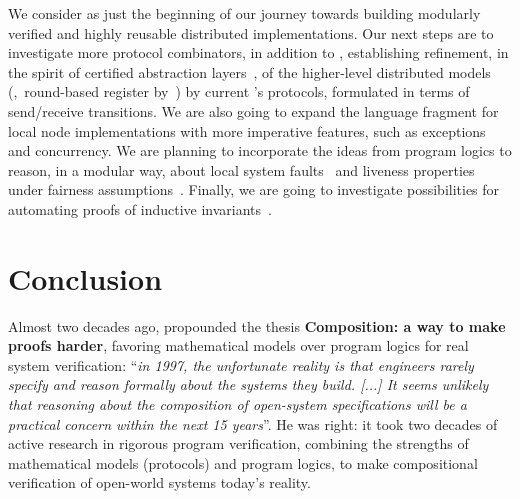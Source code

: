 We consider \disel as just the beginning of our journey towards
building modularly verified and highly reusable distributed
implementations.
%
Our next steps are to investigate more protocol combinators, in
addition to , establishing refinement, in the spirit of
certified abstraction layers~\cite{Gu-al:OSDI16}, of the higher-level
distributed models (\eg,~round-based register
by~\cite{Boichat-al:SN03}) by current \disel's protocols, formulated
in terms of send/receive transitions.
%
We are also going to expand the language fragment for local node
implementations with more imperative features, such as exceptions and
concurrency.
%
We are planning to incorporate the ideas from program logics to
reason, in a modular way, about local system
faults~\cite{Ntzik-al:APLAS15} and liveness properties under fairness
assumptions~\cite{Liang-Feng:POPL16}.
%
Finally, we are going to investigate possibilities for automating
proofs of inductive
invariants~\cite{Padon-al:PLDI16,Padon-al:OOPSLA17}.

\vspace{-5pt}

\section{Conclusion}
\label{sec:conclusion}

Almost two decades ago, \citet{Lamport:COMPOS97} propounded the thesis
\textbf{Composition: a way to make proofs harder}, favoring
mathematical models over program logics for real system verification:
%
``\emph{in 1997, the unfortunate reality is that engineers rarely
  specify and reason formally about the systems they
  build. \emph{[...]} It seems unlikely that reasoning about the
  composition of open-system specifications will be a practical
  concern within the next 15 years}''.
%
He was right: it took two decades of active research in rigorous
program verification, combining the strengths of mathematical models
(protocols) and program logics, to make compositional verification of
open-world systems today's reality.

\vspace{-5pt}


